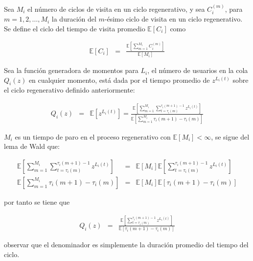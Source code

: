 \documentclass{article}
\newcommand{\esp}{\mathbb{E}}
\numberwithin{equation}{section}
\begin{document}
{Sea $M_{i}$  el n\'umero de ciclos de visita en un ciclo regenerativo, y sea $C_{i}^{(m)}$, para $m=1,2,\ldots,M_{i}$ la duraci\'on del $m$-\'esimo ciclo de visita en un ciclo regenerativo. Se define el ciclo del tiempo de visita promedio $\esp\left[C_{i}\right]$ como

\begin{eqnarray*}
\esp\left[C_{i}\right]&=&\frac{\esp\left[\sum_{m=1}^{M_{i}}C_{i}^{(m)}\right]}{\esp\left[M_{i}\right]}
\end{eqnarray*}




Sea la funci\'on generadora de momentos para $L_{i}$, el n\'umero de usuarios en la cola $Q_{i}\left(z\right)$ en cualquier momento, est\'a dada por el tiempo promedio de $z^{L_{i}\left(t\right)}$ sobre el ciclo regenerativo definido anteriormente:

\begin{eqnarray*}
Q_{i}\left(z\right)&=&\esp\left[z^{L_{i}\left(t\right)}\right]=\frac{\esp\left[\sum_{m=1}^{M_{i}}\sum_{t=\tau_{i}\left(m\right)}^{\tau_{i}\left(m+1\right)-1}z^{L_{i}\left(t\right)}\right]}{\esp\left[\sum_{m=1}^{M_{i}}\tau_{i}\left(m+1\right)-\tau_{i}\left(m\right)\right]}
\end{eqnarray*}

$M_{i}$ es un tiempo de paro en el proceso regenerativo con $\esp\left[M_{i}\right]<\infty$, se sigue del lema de Wald que:


\begin{eqnarray*}
\esp\left[\sum_{m=1}^{M_{i}}\sum_{t=\tau_{i}\left(m\right)}^{\tau_{i}\left(m+1\right)-1}z^{L_{i}\left(t\right)}\right]&=&\esp\left[M_{i}\right]\esp\left[\sum_{t=\tau_{i}\left(m\right)}^{\tau_{i}\left(m+1\right)-1}z^{L_{i}\left(t\right)}\right]\\
\esp\left[\sum_{m=1}^{M_{i}}\tau_{i}\left(m+1\right)-\tau_{i}\left(m\right)\right]&=&\esp\left[M_{i}\right]\esp\left[\tau_{i}\left(m+1\right)-\tau_{i}\left(m\right)\right]
\end{eqnarray*}

por tanto se tiene que


\begin{eqnarray*}
Q_{i}\left(z\right)&=&\frac{\esp\left[\sum_{t=\tau_{i}\left(m\right)}^{\tau_{i}\left(m+1\right)-1}z^{L_{i}\left(t\right)}\right]}{\esp\left[\tau_{i}\left(m+1\right)-\tau_{i}\left(m\right)\right]}
\end{eqnarray*}

observar que el denominador es simplemente la duraci\'on promedio del tiempo del ciclo.


}
\end{document}

